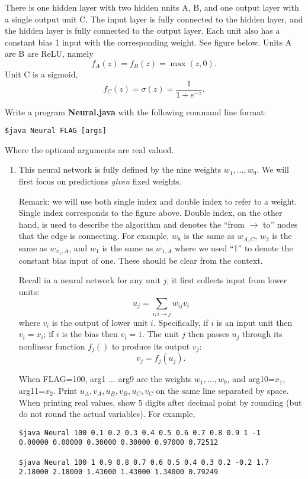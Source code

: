 \documentclass{article}
\begin{document}
There is one hidden layer with two hidden units A, B, and one output layer with a single output unit C.
The input layer is fully connected to the hidden layer, and the hidden layer is fully connected to the output layer.
Each unit also has a constant bias 1 input with the corresponding weight. See figure below.
Units A are B are ReLU, namely 
$$f_A(z)=f_B(z)=\max(z, 0).$$
Unit C is a sigmoid,
$$f_C(z)=\sigma(z)=\frac{1}{1+e^{-z}}.$$




Write a program \textbf{Neural.java} with the following command line format:
\begin{verbatim}
$java Neural FLAG [args]
\end{verbatim}
Where the optional arguments are real valued.


\begin{enumerate}
\item
This neural network is fully defined by the nine weights $w_1, \ldots, w_9$.
We will first focus on predictions \emph{given} fixed weights.

Remark: we will use both single index and double index to refer to a weight.
Single index corresponds to the figure above.
Double index, on the other hand, is used to describe the algorithm and denotes the ``from $\rightarrow$ to'' nodes that the edge is connecting.
For example, $w_8$ is the same as $w_{A,C}$, $w_2$ is the same as $w_{x_1, A}$, and $w_1$ is the same as $w_{1,A}$ where we used ``1'' to denote the constant bias input of one.
These should be clear from the context.

Recall in a neural network for any unit $j$, it first collects input from lower units:
$$u_j = \sum_{i: i\rightarrow j} w_{ij} v_i$$
where $v_i$ is the output of lower unit $i$. Specifically, if $i$ is an input unit then $v_i=x_i$; if $i$ is the bias then $v_i=1$.
The unit $j$ then passes $u_j$ through its nonlinear function $f_j()$ to produce its output $v_j$:
$$v_j = f_j(u_j).$$

When FLAG=100, arg1 ... arg9 are the weights $w_1, \ldots, w_9$, and arg10=$x_1$, arg11=$x_2$.
Print $u_A, v_A, u_B, v_B, u_C, v_C$ on the same line separated by space. When printing real values, show 5 digits after decimal point by rounding (but do not round the actual variables).
For example,
\begin{verbatim}
$java Neural 100 0.1 0.2 0.3 0.4 0.5 0.6 0.7 0.8 0.9 1 -1
0.00000 0.00000 0.30000 0.30000 0.97000 0.72512 

$java Neural 100 1 0.9 0.8 0.7 0.6 0.5 0.4 0.3 0.2 -0.2 1.7
2.18000 2.18000 1.43000 1.43000 1.34000 0.79249 


\end{verbatim}
\end{enumerate}
\end{document}
